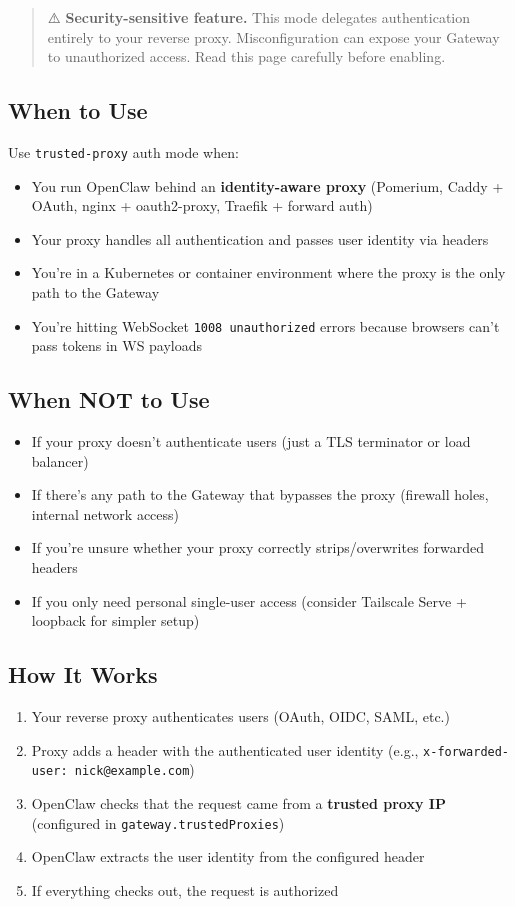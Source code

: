 \begin{quote}
⚠️ \textbf{Security-sensitive feature.} This mode delegates authentication entirely to your reverse proxy. Misconfiguration can expose your Gateway to unauthorized access. Read this page carefully before enabling.
\end{quote}


\subsection{When to Use}


Use \texttt{trusted-proxy} auth mode when:

\begin{itemize}
  \item You run OpenClaw behind an \textbf{identity-aware proxy} (Pomerium, Caddy + OAuth, nginx + oauth2-proxy, Traefik + forward auth)
  \item Your proxy handles all authentication and passes user identity via headers
  \item You're in a Kubernetes or container environment where the proxy is the only path to the Gateway
  \item You're hitting WebSocket \texttt{1008 unauthorized} errors because browsers can't pass tokens in WS payloads
\end{itemize}


\subsection{When NOT to Use}


\begin{itemize}
  \item If your proxy doesn't authenticate users (just a TLS terminator or load balancer)
  \item If there's any path to the Gateway that bypasses the proxy (firewall holes, internal network access)
  \item If you're unsure whether your proxy correctly strips/overwrites forwarded headers
  \item If you only need personal single-user access (consider Tailscale Serve + loopback for simpler setup)
\end{itemize}


\subsection{How It Works}


\begin{enumerate}
  \item Your reverse proxy authenticates users (OAuth, OIDC, SAML, etc.)
  \item Proxy adds a header with the authenticated user identity (e.g., \texttt{x-forwarded-user: nick@example.com})
  \item OpenClaw checks that the request came from a \textbf{trusted proxy IP} (configured in \texttt{gateway.trustedProxies})
  \item OpenClaw extracts the user identity from the configured header
  \item If everything checks out, the request is authorized
\end{enumerate}


